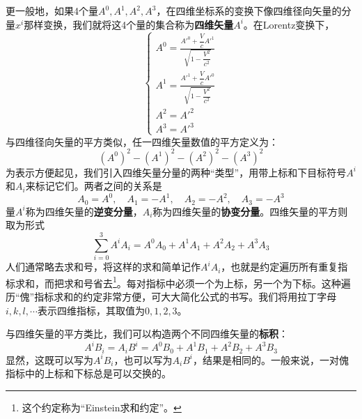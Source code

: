 更一般地，如果4个量$A^0,A^1,A^2,A^3$，在四维坐标系的变换下像四维径向矢量的分量$x^i$那样变换，我们就将这4个量的集合称为{\bf 四维矢量}$A^i$。在Lorentz变换下，
\begin{equation}
\begin{cases}
	\displaystyle A^0 = \frac{A'^0+\dfrac{V}{c}A'^1}{\sqrt{1-\dfrac{V^2}{c^2}}} \\[1.5ex]
	\displaystyle A^1 = \frac{A'^1+\dfrac{V}{c}A'^0}{\sqrt{1-\dfrac{V^2}{c^2}}} \\[1.5ex]
	A^2 = A'^2 \\[1.5ex]
	A^3 = A'^3 
\end{cases}
\end{equation}
与四维径向矢量的平方类似，任一四维矢量数值的平方定义为：
\begin{equation*}
	(A^0)^2-(A^1)^2-(A^2)^2-(A^3)^2
\end{equation*}
为表示方便起见，我们引入四维矢量分量的两种“类型”，用带上标和下目标符号$A^i$和$A_i$来标记它们。两者之间的关系是
\begin{equation}
	A_0 = A^0,\quad A_1 = -A^1,\quad A_2 = -A^2,\quad A_3 = -A^3
\end{equation}
量$A^i$称为四维矢量的{\bf 逆变分量}，$A_i$称为四维矢量的{\bf 协变分量}。四维矢量的平方则取为形式
\begin{equation*}
	\sum_{i=0}^3 A^iA_i = A^0A_0+A^1A_1+A^2A_2+A^3A_3
\end{equation*}
人们通常略去求和号，将这样的求和简单记作$A^iA_i$，也就是约定遍历所有重复指标求和，而把求和号省去\footnote{这个约定称为“Einstein求和约定”。}。每对指标中必须一个为上标，另一个为下标。这种遍历“傀”指标求和的约定非常方便，可大大简化公式的书写。我们将用拉丁字母$i,k,l,\cdots$表示四维指标，其取值为$0,1,2,3$。

与四维矢量的平方类比，我们可以构造两个不同四维矢量的{\bf 标积}：
\begin{equation*}
	A^iB_i = A_iB^i = A^0B_0+A^1B_1+A^2B_2+A^3B_3
\end{equation*}
显然，这既可以写为$A^iB_i$，也可以写为$A_iB^i$，结果是相同的。一般来说，一对傀指标中的上标和下标总是可以交换的。

